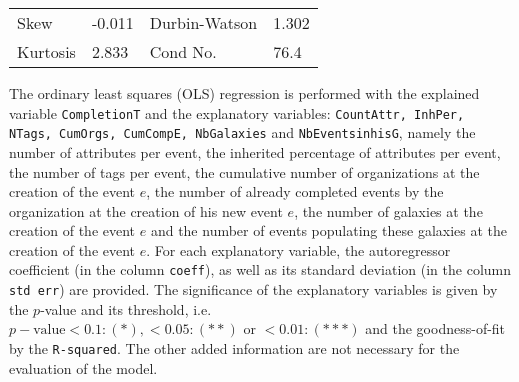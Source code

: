 \documentclass[unnumsec,webpdf,contemporary,large]{oup-authoring-template}%
\theoremstyle{thmstyleone}%
\theoremstyle{thmstyletwo}%
\theoremstyle{thmstylethree}%
\begin{document}
\begin{table}[ht]
\begin{tabular}{lllr}
Skew             & -0.011                          & Durbin-Watson      & \multicolumn{1}{l}{1.302}                              \\
Kurtosis         & 2.833                           & Cond No.           & \multicolumn{1}{l}{76.4}                              \\ \hline
\end{tabular}
\begin{tablenotes}%
\item{The ordinary least squares (OLS) regression is performed with the explained variable \texttt{CompletionT} and the explanatory variables: \texttt{CountAttr, InhPer, NTags, CumOrgs, CumCompE, NbGalaxies} and \texttt{NbEventsinhisG}, namely the number of attributes per event, the inherited percentage of attributes per event, the number of tags per event, the cumulative number of organizations at the creation of the event $e$, the number of already completed events by the organization at the creation of his new event $e$, the number of galaxies at the creation of the event $e$ and the number of events populating these galaxies at the creation of the event $e$. For each explanatory variable, the autoregressor coefficient (in the column \texttt{coeff}), as well as its standard deviation (in the column \texttt{std err}) are provided. The significance of the explanatory variables is given by the $p$-value and its threshold, i.e. $p-\textrm{value} < 0.1: (*), < 0.05: (**) \textrm{ or } < 0.01: (***)$ and the goodness-of-fit by the \texttt{R-squared}. The other added information are not necessary for the evaluation of the model.}
\end{tablenotes}
\label{tab:OLS Stats}
\end{table}
\end{document}
